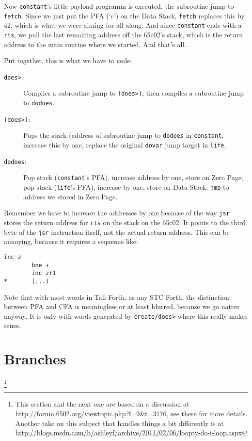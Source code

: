 Now \texttt{constant}'s little payload programm is executed, the subroutine jump
to \texttt{fetch}. Since we just put the PFA (`c') on the Data Stack,
\texttt{fetch} replaces this by 42, which is what we were aiming for all along.
And since \texttt{constant} ends with a \texttt{rts}, we pull the last remaining
address off the 65c02's stack, which is the return address to the main routine
where we started. And that's all. 

Put together, this is what we have to code: 

\begin{description}

        \item [\texttt{does>}:] Compiles a subroutine jump to \texttt{(does>)},
                then compiles a subroutine jump to \texttt{dodoes}.

        \item [\texttt{(does>)}:] Pops the stack (address of subroutine jump to
                \texttt{dodoes} in \texttt{constant}, increase this by one,
                replace the original \texttt{dovar} jump target in \texttt{life}. 

        \item [\texttt{dodoes}:] Pop stack (\texttt{constant}'s PFA), increase
                address by one, store on Zero Page; pop stack (\texttt{life}'s
                PFA), increase by one, store on Data Stack; \texttt{jmp} to
                address we stored in Zero Page. 

\end{description}

Remember we have to increase the addresses by one because of the way
\texttt{jsr} stores the return address for \texttt{rts} on the stack on the
65c02: It points to the third byte of the \texttt{jsr} instruction itself, not
the actual return address.  This can be annoying, because it requires a sequence
like:

\begin{lstlisting}[frame=single]
        inc z
        bne +
        inc z+1 
*       (...) 
\end{lstlisting}

Note that with most words in Tali Forth, as any STC Forth, the distinction
between PFA and CFA is meaningless or at least blurred, because we go native
anyway. It is only with words generated by \texttt{create/does>} where this
really makes sense.

\section{Branches} 
\footnote{This section and the next one are based on a discussion at
\href{http://forum.6502.org/viewtopic.php?f=9\&t=3176}
{http://forum.6502.org/viewtopic.php?f=9\&t=3176}, see there for more details.
Another take on this subject that handles things a bit differently is at
\href{http://blogs.msdn.com/b/ashleyf/archive/2011/02/06/loopty-do-i-loop.aspx}{http://blogs.msdn.com/b/ashleyf/archive/2011/02/06/loopty-do-i-loop.aspx}
}

